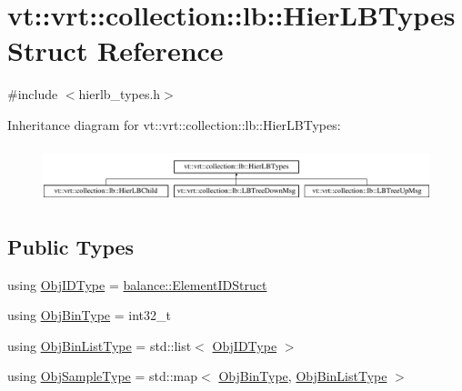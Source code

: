 \hypertarget{structvt_1_1vrt_1_1collection_1_1lb_1_1_hier_l_b_types}{}\section{vt\+:\+:vrt\+:\+:collection\+:\+:lb\+:\+:Hier\+L\+B\+Types Struct Reference}
\label{structvt_1_1vrt_1_1collection_1_1lb_1_1_hier_l_b_types}


{\ttfamily \#include $<$hierlb\+\_\+types.\+h$>$}

Inheritance diagram for vt\+:\+:vrt\+:\+:collection\+:\+:lb\+:\+:Hier\+L\+B\+Types\+:\begin{figure}[H]
\begin{center}
\leavevmode
\includegraphics[height=1.623188cm]{structvt_1_1vrt_1_1collection_1_1lb_1_1_hier_l_b_types}
\end{center}
\end{figure}
\subsection*{Public Types}
\begin{DoxyCompactItemize}
\item 
using \hyperlink{structvt_1_1vrt_1_1collection_1_1lb_1_1_hier_l_b_types_a9f71a6bbdc8603a2c58172521f82c5e2}{Obj\+I\+D\+Type} = \hyperlink{structvt_1_1vrt_1_1collection_1_1balance_1_1_element_i_d_struct}{balance\+::\+Element\+I\+D\+Struct}
\item 
using \hyperlink{structvt_1_1vrt_1_1collection_1_1lb_1_1_hier_l_b_types_a280971a7971a7fc215214e81ba3b12b5}{Obj\+Bin\+Type} = int32\+\_\+t
\item 
using \hyperlink{structvt_1_1vrt_1_1collection_1_1lb_1_1_hier_l_b_types_ac1e6fedb923b2a16f440a61e6dc94173}{Obj\+Bin\+List\+Type} = std\+::list$<$ \hyperlink{structvt_1_1vrt_1_1collection_1_1lb_1_1_hier_l_b_types_a9f71a6bbdc8603a2c58172521f82c5e2}{Obj\+I\+D\+Type} $>$
\item 
using \hyperlink{structvt_1_1vrt_1_1collection_1_1lb_1_1_hier_l_b_types_a597a60d517207b90e8c7984eac434e8f}{Obj\+Sample\+Type} = std\+::map$<$ \hyperlink{structvt_1_1vrt_1_1collection_1_1lb_1_1_hier_l_b_types_a280971a7971a7fc215214e81ba3b12b5}{Obj\+Bin\+Type}, \hyperlink{structvt_1_1vrt_1_1collection_1_1lb_1_1_hier_l_b_types_ac1e6fedb923b2a16f440a61e6dc94173}{Obj\+Bin\+List\+Type} $>$
\end{DoxyCompactItemize}


